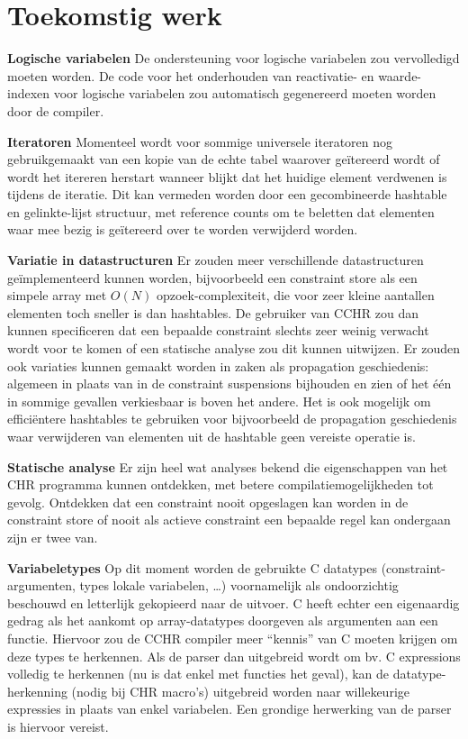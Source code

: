 \section{Toekomstig werk}

{\bf Logische variabelen} De ondersteuning voor logische variabelen zou vervolledigd moeten worden. De code voor het onderhouden van reactivatie- en waarde-indexen voor logische variabelen zou automatisch gegenereerd moeten worden door de compiler.

{\bf Iteratoren} Momenteel wordt voor sommige universele iteratoren nog gebruikgemaakt van een kopie van de echte tabel waarover ge\"itereerd wordt of wordt het itereren herstart wanneer blijkt dat het huidige element verdwenen is tijdens de iteratie. Dit kan vermeden worden door een gecombineerde hashtable en gelinkte-lijst structuur, met reference counts om te beletten dat elementen waar mee bezig is ge\"itereerd over te worden verwijderd worden. 

{\bf Variatie in datastructuren} Er zouden meer verschillende datastructuren ge\"implementeerd kunnen worden, bijvoorbeeld een constraint store als een simpele array met $O(N)$ opzoek-complexiteit, die voor zeer kleine aantallen elementen toch sneller is dan hashtables. De gebruiker van CCHR zou dan kunnen specificeren dat een bepaalde constraint slechts zeer weinig verwacht wordt voor te komen of een statische analyse zou dit kunnen uitwijzen. Er zouden ook variaties kunnen gemaakt worden in zaken als propagation geschiedenis: algemeen in plaats van in de constraint suspensions bijhouden en zien of het \'e\'en in sommige gevallen verkiesbaar is boven het andere. Het is ook mogelijk om effici\"entere hashtables te gebruiken voor bijvoorbeeld de propagation geschiedenis waar verwijderen van elementen uit de hashtable geen vereiste operatie is.

{\bf Statische analyse} Er zijn heel wat analyses bekend die eigenschappen van het CHR programma kunnen ontdekken, met betere compilatiemogelijkheden tot gevolg. Ontdekken dat een constraint nooit opgeslagen kan worden in de constraint store of nooit als actieve constraint een bepaalde regel kan ondergaan zijn er twee van.

{\bf Variabeletypes} Op dit moment worden de gebruikte C datatypes (constraint-argumenten, types lokale variabelen, \ldots) voornamelijk als ondoorzichtig beschouwd en letterlijk gekopieerd naar de uitvoer. C heeft echter een eigenaardig gedrag als het aankomt op array-datatypes doorgeven als argumenten aan een functie. Hiervoor zou de CCHR compiler meer ``kennis'' van C moeten krijgen om deze types te herkennen. Als de parser dan uitgebreid wordt om bv. C expressions volledig te herkennen (nu is dat enkel met functies het geval), kan de datatype-herkenning (nodig bij CHR macro's) uitgebreid worden naar willekeurige expressies in plaats van enkel variabelen. Een grondige herwerking van de parser is hiervoor vereist.

